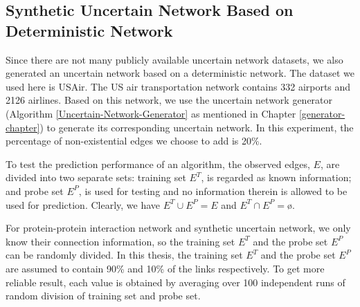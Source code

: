 \documentclass[\main/thesis.tex]{subfiles}
\begin{document}
\subsection*{Synthetic Uncertain Network Based on Deterministic Network} \label{Synthetic-Uncertain-Network-Based-on-Deterministic-Network}
Since there are not many publicly available uncertain network datasets, we also generated an uncertain network based on a deterministic network. The dataset we used here is USAir. The US air transportation network contains 332 airports and 2126 airlines. Based on this network, we use the uncertain network generator  (Algorithm \ref{Uncertain-Network-Generator} as mentioned in Chapter \ref{generator-chapter}) to generate its corresponding uncertain network. In this experiment, the percentage of non-existential edges we choose to add is 20\%.

To test the prediction performance of an algorithm, the observed edges, $E$, are divided into two separate sets: training set $E^T$, is regarded as known information; and probe set $E^P$, is used for testing and no information therein is allowed to be used for prediction. Clearly, we have $E^T \cup E^P = E$ and $E^T \cap E^P = $\o. 

For protein-protein interaction network and synthetic uncertain network, we only know their connection information, so the training set $E^T$ and the probe set $E^P$ can be randomly divided. In this thesis, the training set $E^T$ and the probe set $E^P$ are assumed to contain 90\% and 10\% of the links respectively. To get more reliable result, each value is obtained by averaging over 100 independent runs of random division of training set and probe set.
\end{document}
